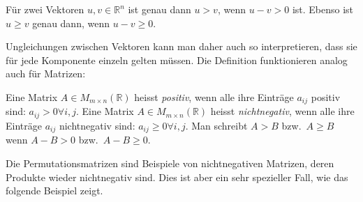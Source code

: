 \begin{definition}
Für zwei Vektoren $u,v\in\mathbb{R}^n$ ist genau dann $u>v$, wenn
$u-v > 0$ ist.
Ebenso ist $u\ge v$ genau dann, wenn $u-v\ge 0$.
\end{definition}

Ungleichungen zwischen Vektoren kann man daher auch so interpretieren,
dass sie für jede Komponente einzeln gelten müssen.
Die Definition funktionieren analog auch für Matrizen:

\begin{definition}
Eine Matrix $A\in M_{m\times n}(\mathbb{R})$  heisst {\em positiv},
wenn alle ihre Einträge $a_{ij}$ positiv sind: $a_{ij}>0\forall i,j$.
Eine Matrix $A\in M_{m\times n}(\mathbb{R})$  heisst {\em nichtnegativ},
wenn alle ihre Einträge $a_{ij}$ nichtnegativ sind: $a_{ij}\ge 0\forall i,j$.
%
%
Man schreibt $A>B$ bzw.~$A\ge B$ wenn $A-B>0$ bzw.~$A-B\ge 0$.
\end{definition}

Die Permutationsmatrizen sind Beispiele von nichtnegativen Matrizen,
deren Produkte wieder nichtnegativ sind.
Dies ist aber ein sehr spezieller Fall, wie das folgende Beispiel
zeigt.

